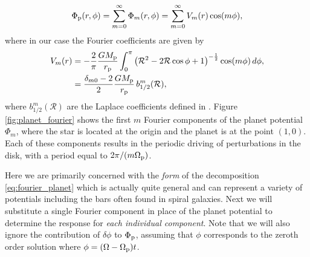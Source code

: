 \begin{align}
    \Phi_{\rm p}(r,\phi) = \sum_{m=0}^\infty \Phi_m (r,\phi) = \sum_{m=0}^\infty V_m (r) \cos (m \phi), \label{eq:fourier_planet}
\end{align}
where in our case the Fourier coefficients are given by 
\begin{align}
    V_m (r) &= - \frac{2}{\pi} \frac{G M_{\rm p}}{r_{\rm p}} \int_0^\pi  \left( \mathcal{R}^2 - 2 \mathcal{R} \cos \phi + 1\right)^{-\frac{1}{2}} \cos (m \phi) \, d\phi, \\
    &= \frac{\delta_{m0} - 2}{2} \frac{G M_{\rm p}}{r_{\rm p}} \, b_{1/2}^m (\mathcal{R}),
\end{align}
where $b_{1/2}^m (\mathcal{R})$ are the Laplace coefficients defined in \citet{brouwer1961}.
Figure \ref{fig:planet_fourier} shows the first $m$ Fourier components of the planet potential $\Phi_m$, where the star is located at the origin and the planet is at the point $(1,0)$.
Each of these components results in the periodic driving of perturbations in the disk, with a period equal to $2\pi / (m \Omega_{\rm p})$.

Here we are primarily concerned with the \textit{form} of the decomposition \ref{eq:fourier_planet} which is actually quite general and can represent a variety of potentials including the bars often found in spiral galaxies.
Next we will substitute a single Fourier component in place of the planet potential to determine the response for \textit{each individual component}.
Note that we will also ignore the contribution of $\delta \phi$ to $\Phi_{\rm p}$, assuming that $\phi$ corresponds to the zeroth order solution where $\phi = (\Omega - \Omega_{\rm p}) t$. 

